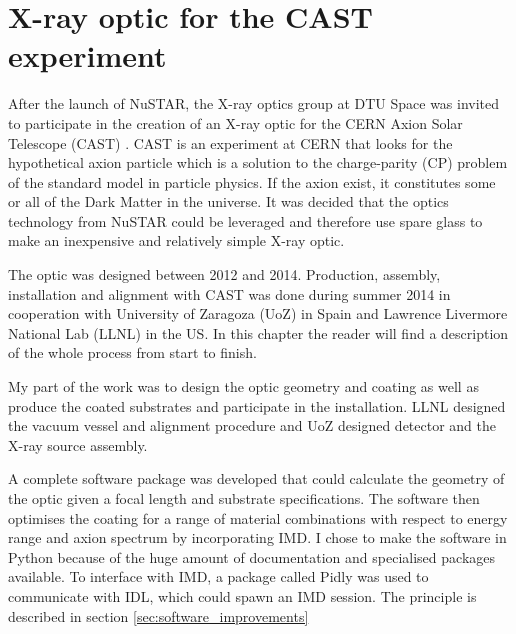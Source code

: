\chapter{X-ray optic for the CAST experiment}\label{chap:cast_xrt}
After the launch of NuSTAR, the X-ray optics group at DTU Space was invited to participate in the creation of an X-ray optic for the CERN Axion Solar Telescope (CAST) \cite{Elias:1387488,Iguaz:1389411}. CAST is an experiment at CERN that looks for the hypothetical axion particle\cite{Weinberg:1978ii,Wilczek:1978kp,Peccei:1977ea,Peccei:1977em} which is a solution to the charge-parity (CP) problem of the standard model in particle physics\cite{Cheng:1988fu}. If the axion exist, it constitutes some or all of the Dark Matter in the universe\cite{Visinelli:2011tw,Bae:2008ix}. It was decided that the optics technology from NuSTAR\cite{Christensen:2011wg,Harrison:2010gu,Koglin:2005kb,Zhang:2009cb,Harrison:2013wl} could be leveraged and therefore use spare glass to make an inexpensive and relatively simple X-ray optic.

The optic was designed between 2012 and 2014. Production, assembly, installation and alignment with CAST was done during summer 2014 in cooperation with University of Zaragoza (UoZ) in Spain and Lawrence Livermore National Lab (LLNL) in the US. In this chapter the reader will find a description of the whole process from start to finish.

My part of the work was to design the optic geometry and coating as well as produce the coated substrates and participate in the installation. LLNL designed the vacuum vessel and alignment procedure and UoZ designed detector and the X-ray source assembly.

A complete software package was developed that could calculate the geometry of the optic given a focal length and substrate specifications. The software then optimises the coating for a range of material combinations with respect to energy range and axion spectrum by incorporating IMD. I chose to make the software in Python because of the huge amount of documentation and specialised packages available. To interface with IMD, a package called Pidly was used to communicate with IDL, which could spawn an IMD session. The principle is described in section \ref{sec:software_improvements}


